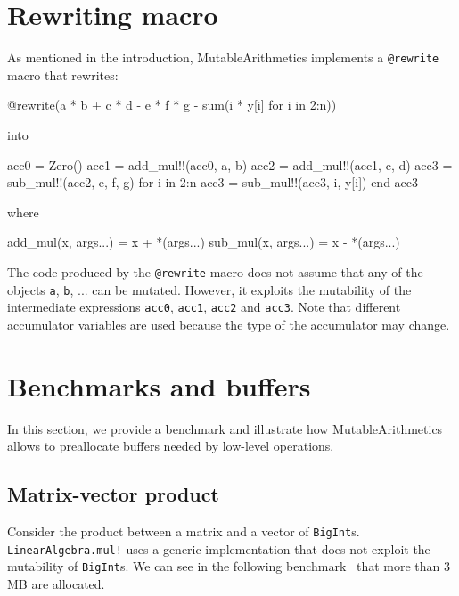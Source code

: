 \documentclass{juliacon}
\newcommand{\ma}{MutableArithmetics}
\begin{document}
\section{Rewriting macro}

As mentioned in the introduction, \ma{} implements a \lstinline|@rewrite| macro that rewrites:
\begin{minipage}{\linewidth}
\begin{jllisting}
@rewrite(a * b + c * d - e * f * g - sum(i * y[i] for i in 2:n))
\end{jllisting}
\end{minipage}
into
\begin{jllisting}
acc0 = Zero()
acc1 = add_mul!!(acc0, a, b)
acc2 = add_mul!!(acc1, c, d)
acc3 = sub_mul!!(acc2, e, f, g)
for i in 2:n
  acc3 = sub_mul!!(acc3, i, y[i])
end
acc3
\end{jllisting}
where
\begin{jllisting}
add_mul(x, args...) = x + *(args...)
sub_mul(x, args...) = x - *(args...)
\end{jllisting}

The code produced by the \lstinline|@rewrite| macro does not assume
that any of the objects \lstinline|a|, \lstinline|b|, ... can be mutated.
However, it exploits the mutability of the intermediate expressions
\lstinline|acc0|, \lstinline|acc1|, \lstinline|acc2| and \lstinline|acc3|.
Note that different accumulator variables are used because the type of the accumulator may change.

\section{Benchmarks and buffers}
In this section, we provide a benchmark and illustrate
how \ma{} allows to preallocate buffers needed by low-level operations.

\subsection{Matrix-vector product}
Consider the product between a matrix and a vector of \lstinline|BigInt|s.
\lstinline|LinearAlgebra.mul!| uses a generic implementation that does not exploit the mutability of \lstinline|BigInt|s.
We can see in the following benchmark~\cite{BenchmarkTools.jl-2016} that more than 3 MB are allocated.
\end{document}
